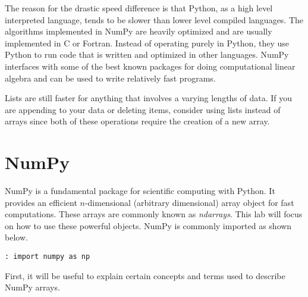 % 

The reason for the drastic speed difference is that Python, as a high level interpreted language, tends to be slower than lower level compiled languages.
The algorithms implemented in NumPy are heavily optimized and are usually implemented in C or Fortran.
Instead of operating purely in Python, they use Python to run code that is written and optimized in other languages.
NumPy interfaces with some of the best known packages for doing computational linear algebra and can be used to write relatively fast programs.

Lists are still faster for anything that involves a varying lengths of data.
If you are appending to your data or deleting items, consider using lists instead of arrays since both of these operations require the creation of a new array.

\section*{NumPy}
NumPy is a fundamental package for scientific computing with Python.
It provides an efficient $n$-dimensional (arbitrary dimensional) array object for fast computations.
These arrays are commonly known as \emph{ndarrays}.
This lab will focus on how to use these powerful objects.
NumPy is commonly imported as shown below.

\begin{lstlisting}
: import numpy as np
\end{lstlisting}
First, it will be useful to explain certain concepts and terms used to describe NumPy arrays.

